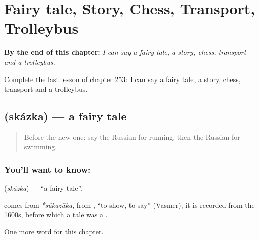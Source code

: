 
\chapter{Fairy tale, Story, Chess, Transport, Trolleybus}
\label{ch:ru-fairy-tale-story-chess-transport-trolleybus}

\begin{chapteropening}
\textbf{By the end of this chapter:} \emph{I can say a fairy tale, a story, chess, transport and a trolleybus.}

Complete the last lesson of chapter 253: I can say a fairy tale, a story, chess, transport and a trolleybus.
\end{chapteropening}

\section[\texorpdfstring{\ru{сказка} (skázka)}{сказка (skázka)}]{ (skázka) — a fairy tale}

\label{lesson:RU-C253-skazka}



\begin{quote}
Before the new one: say the Russian for running, then the Russian for swimming.
\end{quote}

\subsection*{You'll want to know: }
\textbf{} (\emph{skázka}) — \textquotedblleft{}a fairy tale\textquotedblright{}.

\begin{cousinweb}
\textbf{} comes from \emph{*sŭkazŭka}, from \emph{}, \textquotedblleft{}to show, to say\textquotedblright{} (Vasmer); it is recorded from the 1600s, before which a tale was a \emph{}.
\end{cousinweb}

\begin{grammarlens}[title={What you've built}]
One more word for this chapter.
\end{grammarlens}


